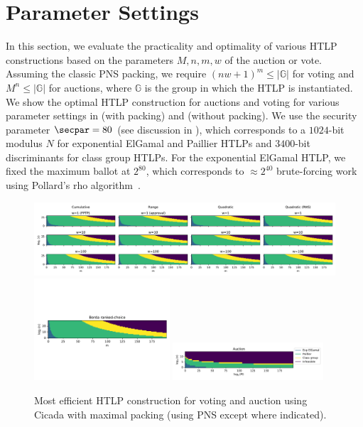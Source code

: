 \section{Parameter Settings}

In this section, we evaluate the practicality and optimality of various HTLP constructions based on the parameters $M,n,m,w$ of the auction or vote. 
Assuming the classic PNS packing, we require $(nw+1)^m\leq\vert\mathbb{G}\vert$ for voting and $M^n\leq\vert\mathbb{G}\vert$ for auctions, where $\mathbb{G}$ is the group in which the HTLP is instantiated.
We show the optimal HTLP construction for auctions and voting for various parameter settings in  (with packing) and  (without packing). We use the security parameter $\secpar=80$ (see discussion in ), which corresponds to a $1024$-bit modulus $N$ for exponential ElGamal and Paillier HTLPs and $3400$-bit discriminants for class group HTLPs. For the exponential ElGamal HTLP, we fixed the maximum ballot at $2^{80}$, which corresponds to $\approx 2^{40}$ brute-forcing work using Pollard's rho algorithm~\cite{Pollard78}.

\begin{figure}[tb!]
    \centering
    \includegraphics[width=\textwidth]{cicada/figs/params/pack_crq.pdf}
    \centering  \includegraphics[width=0.45\textwidth,trim={0cm 3cm 0cm 4.5cm},clip]{cicada/figs/params/pack_borda.pdf}  \includegraphics[width=0.5\textwidth,trim={0cm -1cm 0cm 4.5cm}]{cicada/figs/params/pack_auction.pdf}
    \caption{Most efficient HTLP construction for voting and auction using Cicada with maximal packing (using PNS except where indicated).}
    \label{fig:packed_feasibility}
\end{figure}

